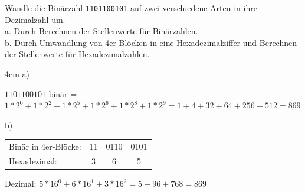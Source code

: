 \question[3]
Wandle die Binärzahl \texttt{1101100101} auf zwei verschiedene Arten in
ihre Dezimalzahl um. \\
a. Durch Berechnen der Stellenwerte für Binärzahlen. \\
b. Durch Umwandlung von 4er-Blöcken in eine Hexadezimalziffer und Berechnen der Stellenwerte
für Hexadezimalzahlen. \\

\begin{solutionbox}{4cm}
a)

$1101100101$ binär = $1*2^0 + 1*2^2 + 1*2^5 + 1*2^6 + 1*2^8 + 1*2^9
 =  1 + 4 + 32 + 64 + 256 + 512 = 869$

b)

\begin{tabular}{@{}l c c c@{}}
Binär in 4er-Blöcke: & 11 & 0110 & 0101 \\
Hexadezimal:         & 3  & 6    & 5    \\
\end{tabular}


Dezimal: $5*16^0 + 6*16^1 + 3*16^2 = 5 + 96 + 768 = 869$
\end{solutionbox}
